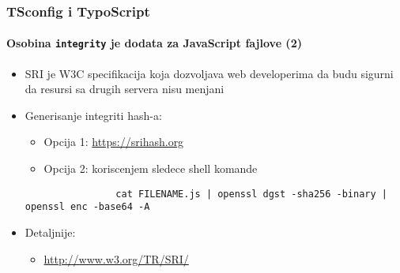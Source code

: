 \begin{frame}[fragile]
	\frametitle{TSconfig i TypoScript}
	\framesubtitle{Osobina \texttt{integrity} je dodata za JavaScript fajlove (2)}


	\begin{itemize}

		\item SRI je W3C specifikacija koja dozvoljava web developerima da budu sigurni
			da resursi sa drugih servera nisu menjani

		\item Generisanje integriti hash-a:

			\begin{itemize}
				\item Opcija 1: \url{https://srihash.org}
				\item Opcija 2: koriscenjem sledece shell komande
			\end{itemize}

			\begin{lstlisting}
				cat FILENAME.js | openssl dgst -sha256 -binary | openssl enc -base64 -A
			\end{lstlisting}

		\item Detaljnije:

			\begin{itemize}
				\item \url{http://www.w3.org/TR/SRI/}
			\end{itemize}

	\end{itemize}

\end{frame}

